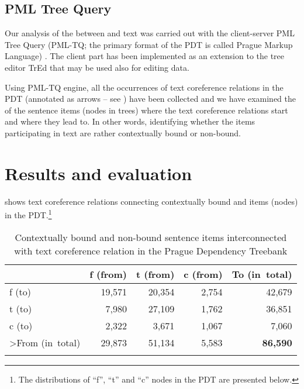 \documentclass[output=paper]{langsci/langscibook.cls}
\begin{document}
\subsection{PML Tree Query\label{rysova_k:sec:PMLTreeQuery}}
                                                                                                                                                                          
Our analysis of the  between  and text  was carried out with the client-server PML Tree Query (PML-TQ; the primary format of the PDT is called Prague Markup Language) \citep{Stepanek2010}. The client part has been implemented as an extension to the tree editor TrEd \citep{Pajas2008} that may be used also for editing data. 

Using PML-TQ engine, all the occurrences of text coreference relations in the PDT (annotated as arrows -- see ) have been collected and we have examined the  of the sentence items (nodes in  trees) where the text coreference relations start and where they lead to. In other words, identifying whether the items participating in text  are rather contextually bound or non-bound.

\section{Results and evaluation\label{rysova_k:sec:ResultsAndEvaluation}}

 shows text coreference relations connecting contextually bound and  items (nodes) in the PDT.\footnote{The distributions of ``f'', ``t'' and ``c'' nodes in the PDT are presented below.}

\begin{table}[p]
\caption{Contextually bound and non-bound sentence items interconnected with text coreference relation in the Prague Dependency Treebank}
\begin{tabularx}{\textwidth}{Xrrrr}
\lsptoprule
 &
f (from) &
t (from) &
c (from) &
To (in~total)\\  
\midrule
f (to) &
19,571 &
20,354 &
2,754 &
42,679\\ 
t (to) &
7,980 &
27,109 &
1,762 &
36,851\\ 
c (to) &
2,322 &
3,671 &
1,067 &
7,060\\ 
\midrule
>From (in~total) &
29,873 &
51,134 &
5,583 &
\textbf{86,590}\\
\lspbottomrule
\end{tabularx}
\label{rysova_k:tab:1}
\end{table}
\end{document}
